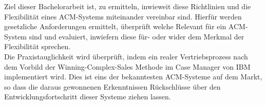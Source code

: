 Ziel dieser Bachelorarbeit ist, zu ermitteln, inwieweit diese Richtlinien und die Flexibilität eines \ac{ACM}-Systems miteinander vereinbar sind. Hierfür werden gesetzliche Anforderungen ermittelt, überprüft welche Relevant für ein \ac{ACM}-System sind und evaluiert, inwiefern diese für- oder wider dem Merkmal der Flexibilität sprechen. \\
Die Praxistauglichkeit wird überprüft, indem ein realer Vertriebsprozess nach dem Vorbild der Winning-Complex-Sales Methode im Case Manager von IBM implementiert wird. Dies ist eins der bekanntesten \ac{ACM}-Systeme auf dem Markt, so dass die daraus gewonnenen Erkenntnissen Rückschlüsse über den Entwicklungsfortschritt dieser Systeme ziehen lassen.




